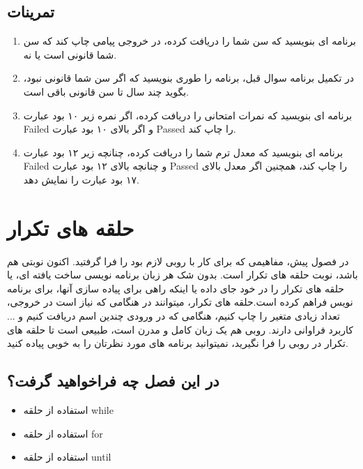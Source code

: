 \documentclass[11pt]{article}
\begin{document}
\subsection{تمرینات}
\begin{enumerate}
\item برنامه ای بنویسید که سن شما را دریافت کرده، در خروجی پیامی چاپ کند که سن شما قانونی است یا نه. 
\item در تکمیل برنامه سوال قبل، برنامه را طوری بنویسید که اگر سن شما قانونی نبود، بگوید چند سال تا سن قانونی باقی است.
\item برنامه ای بنویسید که نمرات امتحانی را دریافت کرده، اگر نمره زیر ۱۰ بود عبارت Failed و اگر بالای ۱۰ بود عبارت Passed را چاپ کند.
\item برنامه ای بنویسید که معدل ترم شما را دریافت کرده، چنانچه زیر ۱۲ بود عبارت Failed و چنانچه بالای ۱۲ بود عبارت Passed را چاپ کند، همچنین اگر معدل بالای ۱۷ بود عبارت 
را نمایش دهد.
\end{enumerate}
\newpage{}
\section{حلقه های تکرار}
در فصول پیش، مفاهیمی که برای کار با روبی لازم بود را فرا گرفتید. اکنون نوبتی هم باشد، نوبت حلقه های تکرار است. بدون شک هر زبان برنامه نویسی ساخت یافته ای، یا حلقه های تکرار را در خود جای داده یا اینکه راهی برای پیاده سازی آنها، برای برنامه نویس فراهم کرده است.حلقه های تکرار، میتوانند در هنگامی که نیاز است در خروجی، تعداد زیادی متغیر را چاپ کنیم، هنگامی که در ورودی چندین اسم دریافت کنیم و ... کاربرد فراوانی دارند. روبی هم یک زبان کامل و مدرن است، طبیعی است تا حلقه های تکرار در روبی را فرا نگیرید، نمیتوانید برنامه های مورد نظرتان را به خوبی پیاده کنید. 
\subsection{در این فصل چه فراخواهید گرفت؟}
\begin{itemize}
\item استفاده از حلقه while
\item استفاده از حلقه for
\item استفاده از حلقه until
\end{itemize}
\end{document}
